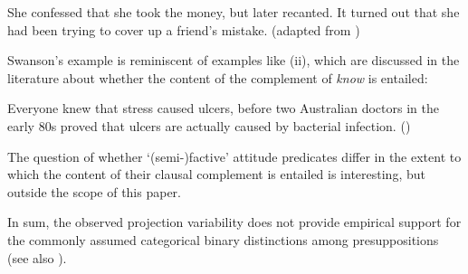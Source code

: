 \documentclass[11pt,fleqn]{article}
\newcommand{\6}{\mbox{$[\hspace*{-.6mm}[$}}
\newcommand{\9}{\mbox{$]\hspace*{-.6mm}]$}}
\begin{document}
{\begin{exe}
 She confessed that she took the money, but later recanted. It turned out that she had been trying to cover up a friend's mistake. \hfill (adapted from \citealt[1540]{swanson2012})
\end{exe}
%
%
Swanson's example is reminiscent of examples like (ii), which are discussed in the literature about whether the content of the complement of {\em know} is entailed:
\begin{exe}
 Everyone knew that stress caused ulcers, before two Australian doctors in the early 80s proved that ulcers are actually caused by bacterial infection. \hfill (\citealt[501]{hazlett2010})
\end{exe}
The question of whether `(semi-)factive' attitude predicates differ in the extent to which the content of their clausal complement is entailed is interesting, but outside the scope of this paper.} In sum, the observed projection variability does not provide empirical support for the commonly assumed categorical binary distinctions among presuppositions (see also \citealt{jayez-etal2015}).
\end{document}
